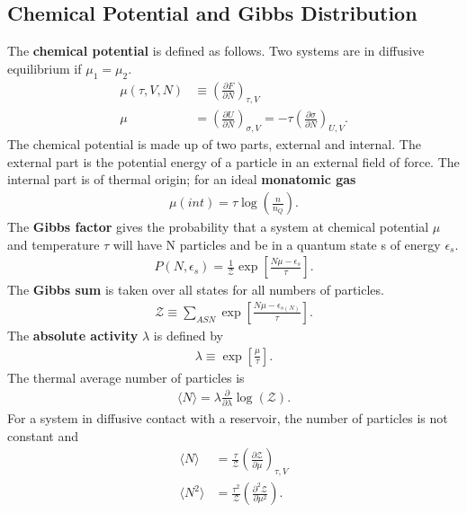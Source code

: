 \begin{multicols}{2}
	\section{Chemical Potential and Gibbs Distribution}
	The \textbf{chemical potential} is defined as follows. Two systems are in diffusive equilibrium if $\mu_1=\mu_2$.
	\begin{align}
		\mu(\tau,V,N)&\equiv \left(\frac{\partial F}{\partial N}\right)_{\tau,V} \\ \mu 	&= \left(\frac{\partial U}{\partial N}\right)_{\sigma,V} = -\tau\left(\frac{\partial \sigma}{\partial N}\right)_{U,V}.
	\end{align}
	The chemical potential is made up of two parts, external and internal. The external part is the potential energy of a particle in an external field of force. The internal part is of thermal origin; for an ideal \textbf{monatomic gas}
	\begin{align}
		\mu(int) = \tau \log\left(\frac{n}{n_Q}\right).
	\end{align}
	The \textbf{Gibbs factor} gives the probability that a system at chemical potential $\mu$ and temperature $\tau$ will have N particles and be in a quantum state s of energy $\epsilon_s$.
	\begin{align}
		P(N,\epsilon_s) = \frac{1}{\mathscr{Z}}\exp\left[\frac{N\mu-\epsilon_{s}}{\tau}\right]. 
	\end{align} 
	The \textbf{Gibbs sum} is taken over all states for all numbers of particles.
	\begin{align}
	\mathscr{Z} \equiv \sum_{ASN} \exp\left[\frac{N\mu-\epsilon_{s(N)}}{\tau}\right].
	\end{align}
	The \textbf{absolute activity} $\lambda$ is defined by
	\begin{align}
	\lambda \equiv \exp\left[\frac{\mu}{\tau}\right].
	\end{align}
	The thermal average number of particles is
	\begin{align}
	\langle N \rangle = \lambda \frac{\partial}{\partial \lambda}\log(\mathscr{Z}).
	\end{align}
	For a system in diffusive contact with a reservoir, the number of particles is not constant and
	\begin{align}
	\langle N \rangle &= \frac{\tau}{\mathscr{Z}}\left(\frac{\partial \mathscr{Z}}{\partial \mu}\right)_{\tau,V} \\
	\langle N^2 \rangle &= \frac{\tau^2}{\mathscr{Z}}\left(\frac{\partial^2 \mathscr{Z}}{\partial \mu^2}\right).
	\end{align}

\end{multicols}
